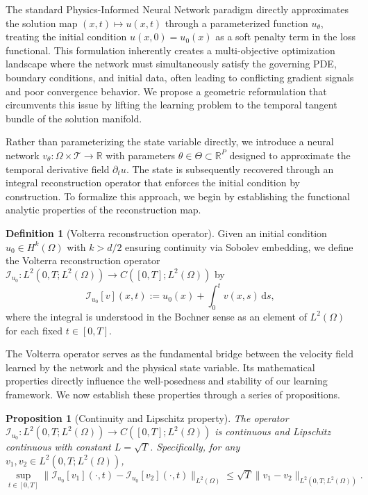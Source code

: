 \documentclass[11pt,reqno]{amsart}
\theoremstyle{plain}
\newtheorem{proposition}[theorem]{Proposition}
\theoremstyle{definition}
\newtheorem{definition}[theorem]{Definition}
\theoremstyle{remark}
\begin{document}
The standard Physics-Informed Neural Network paradigm directly approximates the solution map $(x,t) \mapsto u(x,t)$ through a parameterized function $u_\theta$, treating the initial condition $u(x,0) = u_0(x)$ as a soft penalty term in the loss functional. This formulation inherently creates a multi-objective optimization landscape where the network must simultaneously satisfy the governing PDE, boundary conditions, and initial data, often leading to conflicting gradient signals and poor convergence behavior. We propose a geometric reformulation that circumvents this issue by lifting the learning problem to the temporal tangent bundle of the solution manifold.

Rather than parameterizing the state variable directly, we introduce a neural network $v_\theta: \Omega \times \mathcal{T} \to \mathbb{R}$ with parameters $\theta \in \Theta \subset \mathbb{R}^P$ designed to approximate the temporal derivative field $\partial_t u$. The state is subsequently recovered through an integral reconstruction operator that enforces the initial condition by construction. To formalize this approach, we begin by establishing the functional analytic properties of the reconstruction map.

\begin{definition}[Volterra reconstruction operator]\label{def:volterra_operator}
Given an initial condition $u_0 \in H^k(\Omega)$ with $k > d/2$ ensuring continuity via Sobolev embedding, we define the Volterra reconstruction operator $\mathcal{I}_{u_0}: L^2(0,T; L^2(\Omega)) \to C([0,T]; L^2(\Omega))$ by
\begin{equation} \label{eq:volterra_def}
    \mathcal{I}_{u_0}[v](x,t) := u_0(x) + \int_0^t v(x,s) \, \mathrm{d}s,
\end{equation}
where the integral is understood in the Bochner sense as an element of $L^2(\Omega)$ for each fixed $t \in [0,T]$.
\end{definition}

The Volterra operator serves as the fundamental bridge between the velocity field learned by the network and the physical state variable. Its mathematical properties directly influence the well-posedness and stability of our learning framework. We now establish these properties through a series of propositions.

\begin{proposition}[Continuity and Lipschitz property]\label{prop:continuity}
The operator $\mathcal{I}_{u_0}: L^2(0,T; L^2(\Omega)) \to C([0,T]; L^2(\Omega))$ is continuous and Lipschitz continuous with constant $L = \sqrt{T}$. Specifically, for any $v_1, v_2 \in L^2(0,T; L^2(\Omega))$,
\begin{equation}
    \sup_{t \in [0,T]} \|\mathcal{I}_{u_0}[v_1](\cdot,t) - \mathcal{I}_{u_0}[v_2](\cdot,t)\|_{L^2(\Omega)} \leq \sqrt{T} \|v_1 - v_2\|_{L^2(0,T; L^2(\Omega))}.
\end{equation}
\end{proposition}
\end{document}
